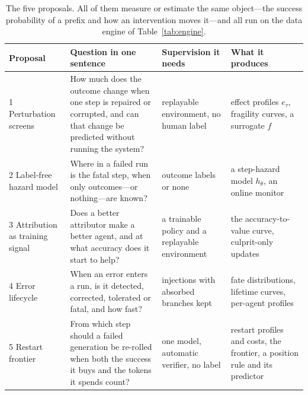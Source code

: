 \documentclass[10pt,a4paper]{article}
\begin{document}
\begin{table}[htbp]\centering\small
\begin{tabularx}{\linewidth}{@{}l >{\RaggedRight\hsize=1.35\hsize}X >{\RaggedRight\hsize=0.75\hsize}X >{\RaggedRight\hsize=0.9\hsize}X@{}}\toprule
Proposal & Question in one sentence & Supervision it needs & What it produces \\\midrule
1 Perturbation screens & How much does the outcome change when one step is repaired or corrupted, and can that change be predicted without running the system? & replayable environment, no human label & effect profiles $e_\tau$, fragility curves, a surrogate $f$ \\
2 Label-free hazard model & Where in a failed run is the fatal step, when only outcomes---or nothing---are known? & outcome labels or none & a step-hazard model $h_\theta$, an online monitor \\
3 Attribution as training signal & Does a better attributor make a better agent, and at what accuracy does it start to help? & a trainable policy and a replayable environment & the accuracy-to-value curve, culprit-only updates \\
4 Error lifecycle & When an error enters a run, is it detected, corrected, tolerated or fatal, and how fast? & injections with absorbed branches kept & fate distributions, lifetime curves, per-agent profiles \\
5 Restart frontier & From which step should a failed generation be re-rolled when both the success it buys and the tokens it spends count? & one model, automatic verifier, no label & restart profiles and costs, the frontier, a position rule and its predictor \\\bottomrule
\end{tabularx}
\caption{The five proposals. All of them measure or estimate the same object---the success probability of a prefix and how an intervention moves it---and all run on the data engine of Table~\ref{tab:engine}.}
\label{tab:roadmap}
\end{table}







\clearpage

\end{document}
